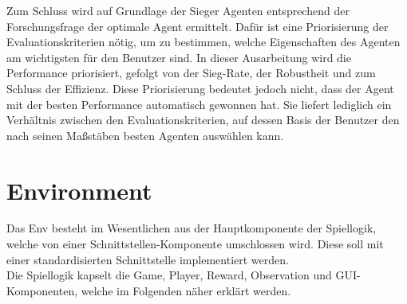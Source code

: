Zum Schluss wird auf Grundlage der Sieger Agenten entsprechend der Forschungsfrage der optimale Agent ermittelt. Dafür ist eine Priorisierung der Evaluationskriterien nötig, um zu bestimmen, welche Eigenschaften des Agenten am wichtigsten für den Benutzer sind. In dieser Ausarbeitung wird die Performance priorisiert, gefolgt von der Sieg-Rate, der Robustheit und zum Schluss der Effizienz. Diese Priorisierung bedeutet jedoch nicht, dass der Agent mit der besten Performance automatisch gewonnen hat. Sie liefert lediglich ein Verhältnis zwischen den Evaluationskriterien, auf dessen Basis der Benutzer den nach seinen Maßstäben besten Agenten auswählen kann.

\section{Environment} \label{sec:Konzept_Environment}
Das Env besteht im Wesentlichen aus der Hauptkomponente der Spiellogik, welche von einer Schnittstellen-Komponente umschlossen wird. Diese soll mit einer standardisierten Schnittstelle  implementiert werden.\\
Die Spiellogik kapselt die Game, Player, Reward, Observation und GUI-Komponenten, welche im Folgenden näher erklärt werden.

